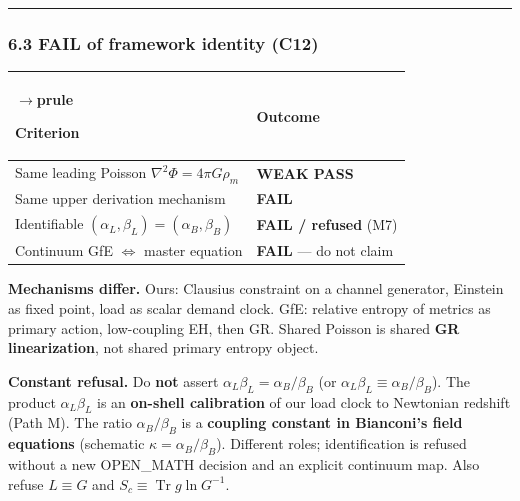 \documentclass[
  11pt,
]{article}
\newcounter{none} %
\begin{document}
\begin{center}\rule{0.5\linewidth}{0.5pt}\end{center}

\subsubsection{\texorpdfstring{6.3 FAIL of framework identity (\textbf{C12})}{6.3 FAIL of framework identity (C12)}}\label{fail-of-framework-identity-c12}

{\def\LTcaptype{none} %
\begin{longtable}[]{@{}
  >{\raggedright\arraybackslash}p{}
  >{\raggedright\arraybackslash}p{}@{}}
$\rightarrow$prule\noalign{}
\begin{minipage}[b]{\linewidth}\raggedright
Criterion
\end{minipage} & \begin{minipage}[b]{\linewidth}\raggedright
Outcome
\end{minipage} \\
\midrule\noalign{}
\endhead
\bottomrule\noalign{}
\endlastfoot
Same leading Poisson \(\nabla^2\Phi=4\pi G\rho_m\) & \textbf{WEAK PASS} \\
Same upper derivation mechanism & \textbf{FAIL} \\
Identifiable \((\alpha_L,\beta_L)=(\alpha_B,\beta_B)\) & \textbf{FAIL / refused} (M7) \\
Continuum GfE \(\Leftrightarrow\) master equation & \textbf{FAIL} --- do not claim \\
\end{longtable}
}

\textbf{Mechanisms differ.} Ours: Clausius constraint on a channel generator, Einstein as fixed point, load as scalar demand clock. GfE: relative entropy of metrics as primary action, low-coupling EH, then GR. Shared Poisson is shared \textbf{GR linearization}, not shared primary entropy object.

\textbf{Constant refusal.} Do \textbf{not} assert \(\alpha_L\beta_L=\alpha_B/\beta_B\) (or \(\alpha_L\beta_L\equiv\alpha_B/\beta_B\)). The product \(\alpha_L\beta_L\) is an \textbf{on-shell calibration} of our load clock to Newtonian redshift (Path M). The ratio \(\alpha_B/\beta_B\) is a \textbf{coupling constant in Bianconi's field equations} (schematic \(\kappa=\alpha_B/\beta_B\)). Different roles; identification is refused without a new OPEN\_MATH decision and an explicit continuum map. Also refuse \(L\equiv G\) and \(S_c\equiv\operatorname{Tr} g\ln G^{-1}\).
\end{document}
